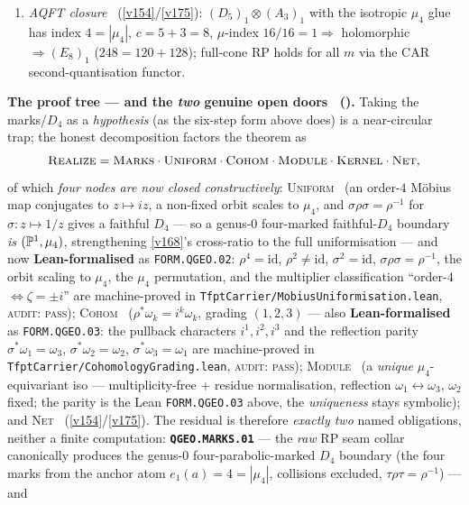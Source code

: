 \begin{keybox}
\begin{enumerate}[leftmargin=2.2em,itemsep=1pt]
\item[\textbf{6}] \emph{AQFT closure} \mE\ (\vref{v154}/\vref{v175}): $(D_5)_1{\otimes}(A_3)_1$ with
  the isotropic $\mu_4$ glue has index $4=|\mu_4|$, $c=5{+}3=8$, $\mu$-index $16/16=1\Rightarrow$
  holomorphic $\Rightarrow(E_8)_1$ ($248=120{+}128$); full-cone RP holds for all $m$ via the CAR
  second-quantisation functor.
\end{enumerate}
\noindent\textbf{The proof tree --- and the \emph{two} genuine open doors \mO\
().} Taking the marks/$D_4$ as a \emph{hypothesis} (as the
six-step form above does) is a near-circular trap; the honest decomposition factors the theorem as
\[
  \textsc{Realize}=\textsc{Marks}\cdot\textsc{Uniform}\cdot\textsc{Cohom}\cdot\textsc{Module}\cdot
  \textsc{Kernel}\cdot\textsc{Net},
\]
of which \emph{four nodes are now closed constructively}: \textsc{Uniform} \mE\ (an order-$4$
M\"obius map conjugates to $z\mapsto iz$, a non-fixed orbit scales to $\mu_4$, and
$\sigma\rho\sigma=\rho^{-1}$ for $\sigma:z\mapsto1/z$ gives a faithful $D_4$ --- so a genus-$0$
four-marked faithful-$D_4$ boundary \emph{is} $(\mathbb P^1,\mu_4)$, strengthening \vref{v168}'s cross-ratio
to the full uniformisation --- and now \textbf{Lean-formalised} as \texttt{FORM.QGEO.02}:
$\rho^4{=}\mathrm{id}$, $\rho^2{\neq}\mathrm{id}$, $\sigma^2{=}\mathrm{id}$,
$\sigma\rho\sigma{=}\rho^{-1}$, the orbit scaling to $\mu_4$, the $\mu_4$ permutation, and the
multiplier classification ``order-$4$ $\Leftrightarrow\zeta{=}\pm i$'' are machine-proved in
\texttt{TfptCarrier/MobiusUniformisation.lean}, \textsc{audit: pass}); \textsc{Cohom} \mE\ ($\rho^*\omega_k=i^k\omega_k$, grading
$(1,2,3)$ --- also \textbf{Lean-formalised} as \texttt{FORM.QGEO.03}: the pullback characters
$i^1,i^2,i^3$ and the reflection parity $\sigma^*\omega_1{=}\omega_3$, $\sigma^*\omega_2{=}\omega_2$,
$\sigma^*\omega_3{=}\omega_1$ are machine-proved in \texttt{TfptCarrier/CohomologyGrading.lean},
\textsc{audit: pass}); \textsc{Module} \mE\ (a \emph{unique} $\mu_4$-equivariant iso --- multiplicity-free $+$
residue normalisation, reflection $\omega_1\!\leftrightarrow\!\omega_3$, $\omega_2$ fixed; the parity is the
Lean \texttt{FORM.QGEO.03} above, the \emph{uniqueness} stays symbolic); and
\textsc{Net} \mE\ (\vref{v154}/\vref{v175}). The residual is therefore \emph{exactly two} named
obligations, neither a finite computation: \textbf{\texttt{QGEO.MARKS.01}} --- the \emph{raw} RP seam
collar canonically produces the genus-$0$ four-parabolic-marked $D_4$ boundary (the four marks from
the anchor atom $e_1(a){=}4{=}|\mu_4|$, collisions excluded, $\tau\rho\tau{=}\rho^{-1}$) --- and

\end{keybox}
